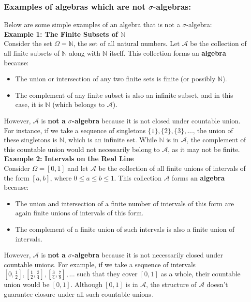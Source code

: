 \subsubsection{Examples of algebras which are not $\sigma$-algebras:}

Below are some simple examples of an algebra that is not a $\sigma$-algebra: \\

\textbf{Example 1: The Finite Subsets of $\mathbb{N}$}\\

Consider the set $\Omega = \mathbb{N}$, the set of all natural numbers. Let $\mathcal{A}$ be the collection of all finite subsets of $\mathbb{N}$ along with $\mathbb{N}$ itself. This collection forms an \textbf{algebra} because:
\begin{itemize}
    \item The union or intersection of any two finite sets is finite (or possibly $\mathbb{N}$).
    \item The complement of any finite subset is also an infinite subset, and in this case, it is $\mathbb{N}$ (which belongs to $\mathcal{A}$).
\end{itemize}

However, $\mathcal{A}$ is \textbf{not a $\sigma$-algebra} because it is not closed under countable union. For instance, if we take a sequence of singletons $\{1\}, \{2\}, \{3\}, \ldots$, the union of these singletons is $\mathbb{N}$, which is an infinite set. While $\mathbb{N}$ is in $\mathcal{A}$, the complement of this countable union would not necessarily belong to $\mathcal{A}$, as it may not be finite.\\

\textbf{Example 2: Intervals on the Real Line}\\

Consider $\Omega = [0, 1]$ and let $\mathcal{A}$ be the collection of all finite unions of intervals of the form $[a, b]$, where $0 \leq a \leq b \leq 1$. This collection $\mathcal{A}$ forms an \textbf{algebra} because:
\begin{itemize}
    \item The union and intersection of a finite number of intervals of this form are again finite unions of intervals of this form.
    \item The complement of a finite union of such intervals is also a finite union of intervals.
\end{itemize}

However, $\mathcal{A}$ is \textbf{not a $\sigma$-algebra} because it is not necessarily closed under countable unions. For example, if we take a sequence of intervals $\left[0, \frac{1}{2}\right], \left[\frac{1}{2}, \frac{3}{4}\right], \left[\frac{3}{4}, \frac{7}{8}\right], \ldots$ such that they cover $[0, 1]$ as a whole, their countable union would be $[0, 1]$. Although $[0, 1]$ is in $\mathcal{A}$, the structure of $\mathcal{A}$ doesn’t guarantee closure under all such countable unions. \\

